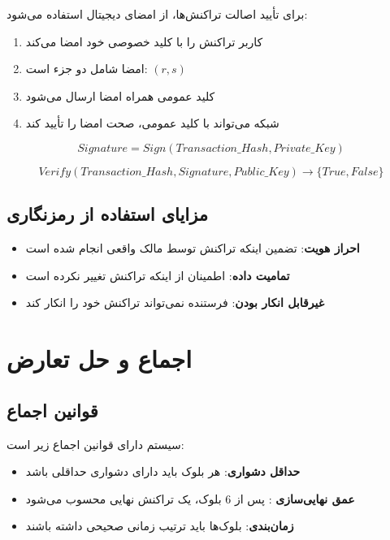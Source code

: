 برای تأیید اصالت تراکنش‌ها، از امضای دیجیتال استفاده می‌شود:

\begin{enumerate}
    \item کاربر تراکنش را با کلید خصوصی خود امضا می‌کند
    \item امضا شامل دو جزء است: $(r, s)$
    \item کلید عمومی همراه امضا ارسال می‌شود
    \item شبکه می‌تواند با کلید عمومی، صحت امضا را تأیید کند
\end{enumerate}

\begin{latin}
\begin{equation}
Signature = Sign(Transaction\_Hash, Private\_Key)
\end{equation}
\end{latin}

\begin{latin}
\begin{equation}
Verify(Transaction\_Hash, Signature, Public\_Key) \rightarrow \{True, False\}
\end{equation}
\end{latin}

\subsection{مزایای استفاده از رمزنگاری}

\begin{itemize}
    \item \textbf{احراز هویت}: تضمین اینکه تراکنش توسط مالک واقعی انجام شده است
    \item \textbf{تمامیت داده}: اطمینان از اینکه تراکنش تغییر نکرده است
    \item \textbf{غیرقابل انکار بودن}: فرستنده نمی‌تواند تراکنش خود را انکار کند
\end{itemize}

\section{اجماع و حل تعارض }

\subsection{قوانین اجماع}

سیستم دارای قوانین اجماع زیر است:

\begin{itemize}
    \item \textbf{حداقل دشواری}: هر بلوک باید دارای دشواری حداقلی باشد
    \item \textbf{عمق نهایی‌سازی }: پس از 6 بلوک، یک تراکنش نهایی محسوب می‌شود
    \item \textbf{زمان‌بندی}: بلوک‌ها باید ترتیب زمانی صحیحی داشته باشند
\end{itemize}


